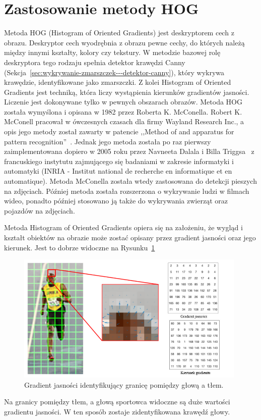 \documentclass[a4paper,twoside,12pt]{book}
\begin{document}
    \section{Zastosowanie metody HOG}\label{sec:zastosowanie-metody-hog}
    Metoda HOG (Histogram of Oriented Gradients) jest deskryptorem cech z obrazu.
    Deskryptor cech wyodrębnia z obrazu pewne cechy, do których należą między innymi kształty, kolory czy tekstury.
    W metodzie bazowej rolę deskryptora tego rodzaju spełnia detektor
    krawędzi Canny (Sekcja~\ref{sec:wykrywanie-zmarszczek---detektor-canny}), który wykrywa krawędzie,
    identyfikowane jako zmarszczki.
    Z kolei Histogram of Oriented Gradients jest techniką, która liczy wystąpienia kierunków gradientów jasności.
    Liczenie jest dokonywane tylko w pewnych obszarach obrazów.
    Metoda HOG została wymyślona i opisana w 1982 przez Roberta K. McConella.
    Robert K. McConell pracował w ówczesnych czasach dla firmy Wayland Research Inc.,
    a opis jego metody został zawarty w patencie ,,Method of and apparatus for pattern recognition''~\cite{patentHOG}.
    Jednak jego metoda została po raz pierwszy zaimplementowana dopiero w 2005 roku przez Navneeta Dalala i Billa Triggsa~\cite{hogZabojady}
    z francuskiego instytutu zajmującego się badaniami w zakresie informatyki i automatyki
    (INRIA - Institut national de recherche en informatique et en automatique).
    Metoda McConella została wtedy zastosowana do detekcji pieszych na zdjęciach.
    Później metoda została rozszerzona o wykrywanie ludzi w filmach wideo,
    ponadto później stosowano ją także do wykrywania zwierząt oraz pojazdów na zdjęciach.

    Metoda Histogram of Oriented Gradients opiera się na założeniu, że wygląd i kształt obiektów na obrazie może zostać
    opisany przez gradient jasności oraz jego kierunek. Jest to dobrze widoczne na
    Rysunku~\ref{fig.gradientJasnosciNaGlowie}

    \begin{figure}
        \centering
        \includegraphics[width=11cm]{Obrazy/gradientJasnosciNaGlowie.jpg}
        \caption{Gradient jasności identyfikujący granicę pomiędzy głową a tłem.~\cite{hogOpenCv}}
        \label{fig.gradientJasnosciNaGlowie}
    \end{figure}
    Na granicy pomiędzy tłem, a głową sportowca widoczne są duże wartości gradientu jasności.
    W ten sposób zostaje zidentyfikowana krawędź głowy.
\end{document}
